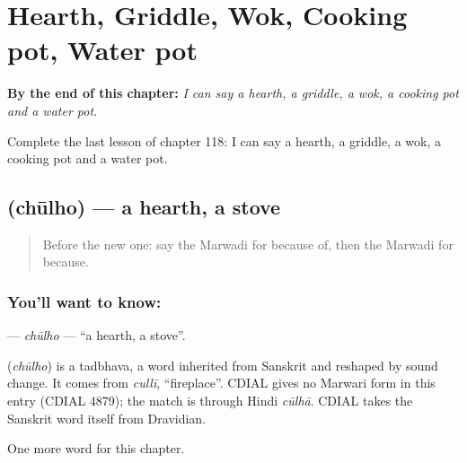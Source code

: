 
\chapter{Hearth, Griddle, Wok, Cooking pot, Water pot}
\label{ch:mw-hearth-griddle-wok-cooking-pot-water-pot}

\begin{chapteropening}
\textbf{By the end of this chapter:} \emph{I can say a hearth, a griddle, a wok, a cooking pot and a water pot.}

Complete the last lesson of chapter 118: I can say a hearth, a griddle, a wok, a cooking pot and a water pot.
\end{chapteropening}

\section[\texorpdfstring{\mw{चूल्हो} (chūlho)}{चूल्हो (chūlho)}]{ (chūlho) — a hearth, a stove}

\label{lesson:MW-C118-chulho}



\begin{quote}
Before the new one: say the Marwadi for because of, then the Marwadi for because.
\end{quote}

\subsection*{You'll want to know: }
\textbf{} — \emph{chūlho} — \textquotedblleft{}a hearth, a stove\textquotedblright{}.

\begin{cousinweb}
\textbf{} (\emph{chūlho}) is a tadbhava, a word inherited from Sanskrit and reshaped by sound change. It comes from \emph{cullī}, \textquotedblleft{}fireplace\textquotedblright{}. CDIAL gives no Marwari form in this entry (CDIAL 4879); the match is through Hindi \emph{cūlhā}. CDIAL takes the Sanskrit word itself from Dravidian.
\end{cousinweb}

\begin{grammarlens}[title={What you've built}]
One more word for this chapter.
\end{grammarlens}

